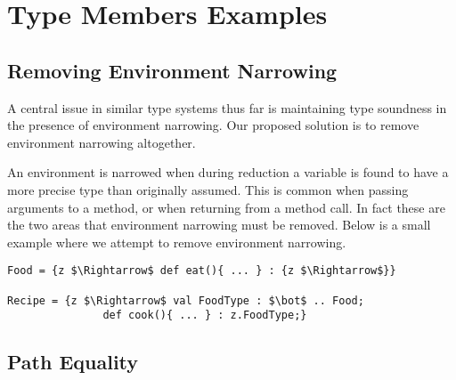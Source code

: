 \documentclass{llncs}
\numberwithin{subcase}{case}
\numberwithin{case}{theorem}
\numberwithin{case}{lemma}
\begin{document}
\section{Type Members Examples}

\subsection{Removing Environment Narrowing}

A central issue in similar type systems thus far is maintaining 
type soundness in the presence of environment narrowing. Our 
proposed solution is to remove environment narrowing altogether.

An environment is narrowed when during reduction a variable is 
found to have a more precise type than originally assumed. This 
is common when passing arguments to a method, or when returning 
from a method call. In fact these are the two areas that environment 
narrowing must be removed. Below is a small example where we attempt to 
remove environment narrowing.
\begin{lstlisting}[mathescape, style=custom_lang]
Food = {z $\Rightarrow$ def eat(){ ... } : {z $\Rightarrow$}}

Recipe = {z $\Rightarrow$ val FoodType : $\bot$ .. Food;
               def cook(){ ... } : z.FoodType;}
\end{lstlisting}

\subsection{Path Equality}




\end{document}
